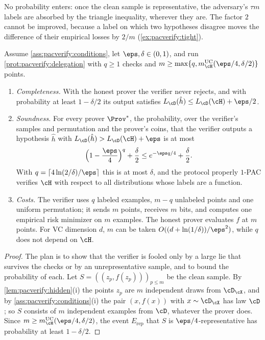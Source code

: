 \begin{refsection}
No probability enters: once the clean sample is representative, the adversary's $\tau m$ labels are absorbed by the triangle inequality, wherever they are. The factor $2$ cannot be improved, because a label on which two hypotheses disagree moves the difference of their empirical losses by $2/m$ (\cref{ex:pacverify:tight}).

\begin{theorem}\label{thm:pacverify:main}
Assume \cref{ass:pacverify:conditions}, let $\eps,\delta\in(0,1)$, and run \cref{prot:pacverify:delegation} with $q\ge1$ checks and $m\ge\max\{q,\pacverifyuc(\eps/4,\delta/2)\}$ points.
\begin{enumerate}
\item \emph{Completeness.} With the honest prover the verifier never rejects, and with probability at least $1-\delta/2$ its output satisfies $L_\cD(\hat h)\le L_\cD(\cH)+\eps/2$.
\item \emph{Soundness.} For every prover $\Prov^*$, the probability, over the verifier's samples and permutation and the prover's coins, that the verifier outputs a hypothesis $\hat h$ with $L_\cD(\hat h)>L_\cD(\cH)+\eps$ is at most
\begin{equation}\label{eq:pacverify:sound}
\Bigl(1-\frac\eps4\Bigr)^q+\frac\delta2\le e^{-\eps q/4}+\frac\delta2.
\end{equation}
With $q=\lceil4\ln(2/\delta)/\eps\rceil$ this is at most $\delta$, and the protocol properly $1$-PAC verifies $\cH$ with respect to all distributions whose labels are a function.
\item \emph{Costs.} The verifier uses $q$ labeled examples, $m-q$ unlabeled points and one uniform permutation; it sends $m$ points, receives $m$ bits, and computes one empirical risk minimizer on $m$ examples. The honest prover evaluates $f$ at $m$ points. For VC dimension $d$, $m$ can be taken $O((d+\ln(1/\delta))/\eps^2)$, while $q$ does not depend on $\cH$.
\end{enumerate}
\end{theorem}

\begin{proof}
The plan is to show that the verifier is fooled only by a large lie that survives the checks or by an unrepresentative sample, and to bound the probability of each. Let $S=((z_p,f(z_p)))_{p\le m}$ be the clean sample. By \cref{lem:pacverify:hidden}(i) the points $z_p$ are $m$ independent draws from $\cD_\cX$, and by \cref{ass:pacverify:conditions}(i) the pair $(x,f(x))$ with $x\sim\cD_\cX$ has law $\cD$; so $S$ consists of $m$ independent examples from $\cD$, whatever the prover does. Since $m\ge\pacverifyuc(\eps/4,\delta/2)$, the event $E_{\mathrm{rep}}$ that $S$ is $\eps/4$-representative has probability at least $1-\delta/2$.


\end{proof}
\end{refsection}
